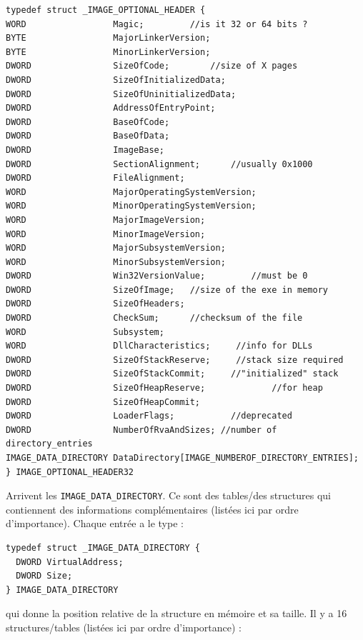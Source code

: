\documentclass{book}
\newcommand{\code}[1]{\texttt{#1}}
\begin{document}
\begin{verbatim}
typedef struct _IMAGE_OPTIONAL_HEADER {
WORD                 Magic;		    //is it 32 or 64 bits ?
BYTE                 MajorLinkerVersion;
BYTE                 MinorLinkerVersion;
DWORD                SizeOfCode;	   	//size of X pages
DWORD                SizeOfInitializedData;
DWORD                SizeOfUninitializedData;
DWORD                AddressOfEntryPoint;
DWORD                BaseOfCode;
DWORD                BaseOfData;
DWORD                ImageBase;
DWORD                SectionAlignment;    	//usually 0x1000
DWORD                FileAlignment;
WORD                 MajorOperatingSystemVersion;
WORD                 MinorOperatingSystemVersion;
WORD                 MajorImageVersion;
WORD                 MinorImageVersion;
WORD                 MajorSubsystemVersion;
WORD                 MinorSubsystemVersion;
DWORD                Win32VersionValue;		    //must be 0
DWORD                SizeOfImage;  	//size of the exe in memory
DWORD                SizeOfHeaders;
DWORD                CheckSum;	  	//checksum of the file
WORD                 Subsystem;
WORD                 DllCharacteristics;	 //info for DLLs
DWORD                SizeOfStackReserve;	 //stack size required
DWORD                SizeOfStackCommit;  	//"initialized" stack
DWORD                SizeOfHeapReserve;     		//for heap
DWORD                SizeOfHeapCommit;
DWORD                LoaderFlags;			//deprecated
DWORD                NumberOfRvaAndSizes; //number of directory_entries
IMAGE_DATA_DIRECTORY DataDirectory[IMAGE_NUMBEROF_DIRECTORY_ENTRIES];
} IMAGE_OPTIONAL_HEADER32
\end{verbatim}

Arrivent les \code{IMAGE\_DATA\_DIRECTORY}. Ce sont des tables/des structures  qui contiennent des informations complémentaires (listées ici par ordre d'importance). Chaque entrée a le type : 

\begin{verbatim}
typedef struct _IMAGE_DATA_DIRECTORY {
  DWORD VirtualAddress;
  DWORD Size;
} IMAGE_DATA_DIRECTORY
\end{verbatim}
qui donne la position relative de la structure en mémoire et sa taille. Il y a 16 structures/tables (listées ici par ordre d'importance) :  
\end{document}
